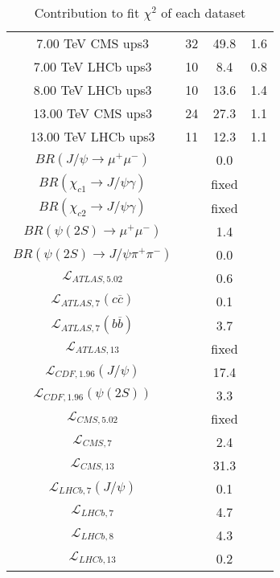 \begin{table}[h!]
\begin{tabular}{c|c|c|c}
7.00 TeV CMS ups3 & 32 & 49.8 & 1.6 \\
7.00 TeV LHCb ups3 & 10 & 8.4 & 0.8 \\
8.00 TeV LHCb ups3 & 10 & 13.6 & 1.4 \\
13.00 TeV CMS ups3 & 24 & 27.3 & 1.1 \\
13.00 TeV LHCb ups3 & 11 & 12.3 & 1.1 \\
\hline
$BR(J/\psi\rightarrow\mu^+\mu^-)$ &  & 0.0 &  \\
$BR(\chi_{c1}\rightarrow J/\psi\gamma)$ &  & fixed & \\
$BR(\chi_{c2}\rightarrow J/\psi\gamma)$ &  & fixed & \\
$BR(\psi(2S)\rightarrow\mu^+\mu^-)$ &  & 1.4 &  \\
$BR(\psi(2S)\rightarrow J/\psi\pi^+\pi^-)$ &  & 0.0 &  \\
$\mathcal L_{ATLAS,5.02}$ &  & 0.6 &  \\
$\mathcal L_{ATLAS,7}(c\overline c)$ &  & 0.1 &  \\
$\mathcal L_{ATLAS,7}(b\overline b)$ &  & 3.7 &  \\
$\mathcal L_{ATLAS,13}$ &  & fixed & \\
$\mathcal L_{CDF,1.96}(J/\psi)$ &  & 17.4 &  \\
$\mathcal L_{CDF,1.96}(\psi(2S))$ &  & 3.3 &  \\
$\mathcal L_{CMS,5.02}$ &  & fixed & \\
$\mathcal L_{CMS,7}$ &  & 2.4 &  \\
$\mathcal L_{CMS,13}$ &  & 31.3 &  \\
$\mathcal L_{LHCb,7}(J/\psi)$ &  & 0.1 &  \\
$\mathcal L_{LHCb,7}$ &  & 4.7 &  \\
$\mathcal L_{LHCb,8}$ &  & 4.3 &  \\
$\mathcal L_{LHCb,13}$ &  & 0.2 &  \\
\end{tabular}
\caption{Contribution to fit $\chi^2$ of each dataset}
\end{table}
